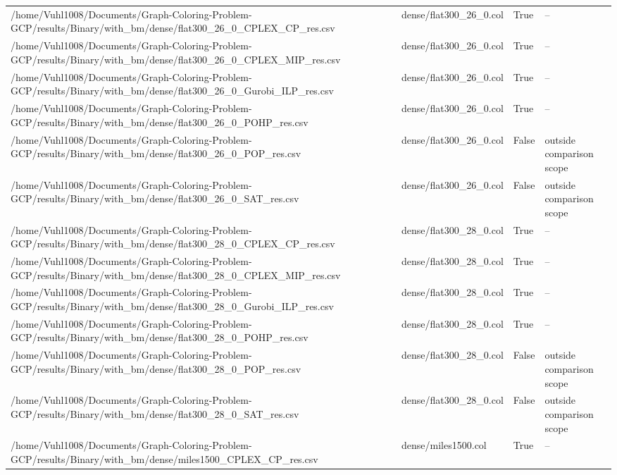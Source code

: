 \begin{table}[htbp]
\begin{tabular}{llll}
/home/Vuhl1008/Documents/Graph-Coloring-Problem-GCP/results/Binary/with\_bm/dense/flat300\_26\_0\_CPLEX\_CP\_res.csv & dense/flat300\_26\_0.col & True & -- \\
/home/Vuhl1008/Documents/Graph-Coloring-Problem-GCP/results/Binary/with\_bm/dense/flat300\_26\_0\_CPLEX\_MIP\_res.csv & dense/flat300\_26\_0.col & True & -- \\
/home/Vuhl1008/Documents/Graph-Coloring-Problem-GCP/results/Binary/with\_bm/dense/flat300\_26\_0\_Gurobi\_ILP\_res.csv & dense/flat300\_26\_0.col & True & -- \\
/home/Vuhl1008/Documents/Graph-Coloring-Problem-GCP/results/Binary/with\_bm/dense/flat300\_26\_0\_POHP\_res.csv & dense/flat300\_26\_0.col & True & -- \\
/home/Vuhl1008/Documents/Graph-Coloring-Problem-GCP/results/Binary/with\_bm/dense/flat300\_26\_0\_POP\_res.csv & dense/flat300\_26\_0.col & False & outside comparison scope \\
/home/Vuhl1008/Documents/Graph-Coloring-Problem-GCP/results/Binary/with\_bm/dense/flat300\_26\_0\_SAT\_res.csv & dense/flat300\_26\_0.col & False & outside comparison scope \\
/home/Vuhl1008/Documents/Graph-Coloring-Problem-GCP/results/Binary/with\_bm/dense/flat300\_28\_0\_CPLEX\_CP\_res.csv & dense/flat300\_28\_0.col & True & -- \\
/home/Vuhl1008/Documents/Graph-Coloring-Problem-GCP/results/Binary/with\_bm/dense/flat300\_28\_0\_CPLEX\_MIP\_res.csv & dense/flat300\_28\_0.col & True & -- \\
/home/Vuhl1008/Documents/Graph-Coloring-Problem-GCP/results/Binary/with\_bm/dense/flat300\_28\_0\_Gurobi\_ILP\_res.csv & dense/flat300\_28\_0.col & True & -- \\
/home/Vuhl1008/Documents/Graph-Coloring-Problem-GCP/results/Binary/with\_bm/dense/flat300\_28\_0\_POHP\_res.csv & dense/flat300\_28\_0.col & True & -- \\
/home/Vuhl1008/Documents/Graph-Coloring-Problem-GCP/results/Binary/with\_bm/dense/flat300\_28\_0\_POP\_res.csv & dense/flat300\_28\_0.col & False & outside comparison scope \\
/home/Vuhl1008/Documents/Graph-Coloring-Problem-GCP/results/Binary/with\_bm/dense/flat300\_28\_0\_SAT\_res.csv & dense/flat300\_28\_0.col & False & outside comparison scope \\
/home/Vuhl1008/Documents/Graph-Coloring-Problem-GCP/results/Binary/with\_bm/dense/miles1500\_CPLEX\_CP\_res.csv & dense/miles1500.col & True & -- \\

\end{tabular}
\end{table}
